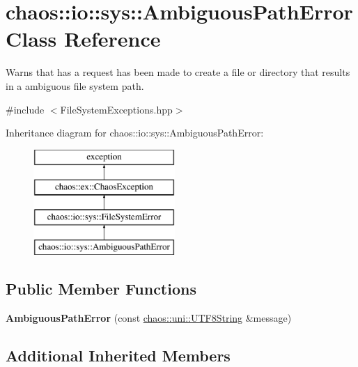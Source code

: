 \hypertarget{classchaos_1_1io_1_1sys_1_1_ambiguous_path_error}{\section{chaos\-:\-:io\-:\-:sys\-:\-:Ambiguous\-Path\-Error Class Reference}
\label{classchaos_1_1io_1_1sys_1_1_ambiguous_path_error}
}


Warns that has a request has been made to create a file or directory that results in a ambiguous file system path.  




{\ttfamily \#include $<$File\-System\-Exceptions.\-hpp$>$}

Inheritance diagram for chaos\-:\-:io\-:\-:sys\-:\-:Ambiguous\-Path\-Error\-:\begin{figure}[H]
\begin{center}
\leavevmode
\includegraphics[height=4.000000cm]{classchaos_1_1io_1_1sys_1_1_ambiguous_path_error}
\end{center}
\end{figure}
\subsection*{Public Member Functions}
\begin{DoxyCompactItemize}
\item 
\hypertarget{classchaos_1_1io_1_1sys_1_1_ambiguous_path_error_a2c52d7f24bd88b11da5542f87b1b0bd9}{{\bfseries Ambiguous\-Path\-Error} (const \hyperlink{classchaos_1_1uni_1_1_u_t_f8_string}{chaos\-::uni\-::\-U\-T\-F8\-String} \&message)}\label{classchaos_1_1io_1_1sys_1_1_ambiguous_path_error_a2c52d7f24bd88b11da5542f87b1b0bd9}

\end{DoxyCompactItemize}
\subsection*{Additional Inherited Members}


